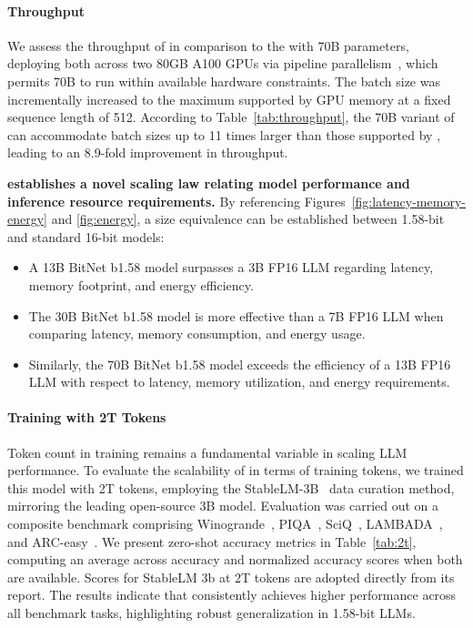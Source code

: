 \paragraph{Throughput}

We assess the throughput of  in comparison to the  with 70B parameters, deploying both across two 80GB A100 GPUs via pipeline parallelism~\cite{gpipe}, which permits  70B to run within available hardware constraints. The batch size was incrementally increased to the maximum supported by GPU memory at a fixed sequence length of 512. According to Table~\ref{tab:throughput}, the 70B variant of  can accommodate batch sizes up to 11 times larger than those supported by , leading to an 8.9-fold improvement in throughput.

\textbf{ establishes a novel scaling law relating model performance and inference resource requirements.} By referencing Figures~\ref{fig:latency-memory-energy} and \ref{fig:energy}, a size equivalence can be established between 1.58-bit and standard 16-bit models:

\begin{itemize}
    \item A 13B BitNet b1.58 model surpasses a 3B FP16 LLM regarding latency, memory footprint, and energy efficiency.
    \item The 30B BitNet b1.58 model is more effective than a 7B FP16 LLM when comparing latency, memory consumption, and energy usage.
    \item Similarly, the 70B BitNet b1.58 model exceeds the efficiency of a 13B FP16 LLM with respect to latency, memory utilization, and energy requirements.
\end{itemize}

\paragraph{Training with 2T Tokens}

Token count in training remains a fundamental variable in scaling LLM performance. To evaluate the scalability of  in terms of training tokens, we trained this model with 2T tokens, employing the StableLM-3B~\cite{StableLM-3B-4E1T} data curation method, mirroring the leading open-source 3B model. Evaluation was carried out on a composite benchmark comprising Winogrande~\cite{winoGrande}, PIQA~\cite{piqa}, SciQ~\cite{sciq}, LAMBADA~\cite{lambada}, and ARC-easy~\cite{arc}. We present zero-shot accuracy metrics in Table~\ref{tab:2t}, computing an average across accuracy and normalized accuracy scores when both are available. Scores for StableLM 3b at 2T tokens are adopted directly from its report. The results indicate that  consistently achieves higher performance across all benchmark tasks, highlighting robust generalization in 1.58-bit LLMs.

